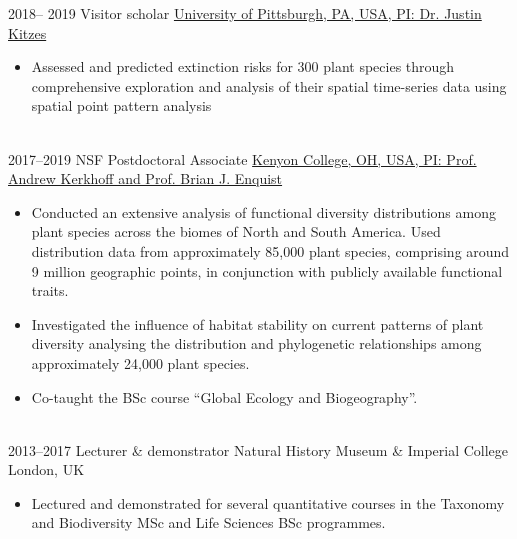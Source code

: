\documentclass[ a4paper]{twentysecondcv} %
\begin{document}
\begin{twenty}
\twentyitem
    	{2018-- 2019}
		{}
        {Visitor scholar}
        {\href{https://www.biology.pitt.edu/}{University of Pittsburgh, PA, USA,  PI: Dr. Justin Kitzes}}
        {}
        {\begin{itemize}
           \item Assessed and predicted extinction risks for 300 plant species through comprehensive exploration and analysis of their spatial time-series data using spatial point pattern analysis
        \end{itemize}}
        \\


	\twentyitem
    	{2017--2019}
		{}
        {NSF Postdoctoral Associate}
        {\href{https://www.kenyon.edu}{Kenyon College, OH, USA, PI: Prof. Andrew Kerkhoff and Prof. Brian J. Enquist}}
        {}
        {
        {\begin{itemize}
     	\item Conducted an extensive analysis of functional diversity distributions among plant species across the biomes of North and South America. Used distribution data from approximately 85,000 plant species, comprising around 9 million geographic points, in conjunction with publicly available functional traits.
	\item Investigated the influence of habitat stability on current patterns of plant diversity analysing the distribution and phylogenetic relationships among approximately 24,000 plant species.
	\item Co-taught the BSc course ``Global Ecology and Biogeography''.
 	\end{itemize}}
        }
    \\   

    \twentyitem
	{2013--2017}
	{}
	{Lecturer \& demonstrator}
	{{Natural History Museum \& Imperial College London, UK}}
	{}
	{
	 {\begin{itemize}
		\item Lectured and demonstrated for several quantitative courses in the Taxonomy and Biodiversity MSc and Life Sciences BSc programmes.
	\end{itemize}}
    	}
        
\end{twenty}

\end{document}
